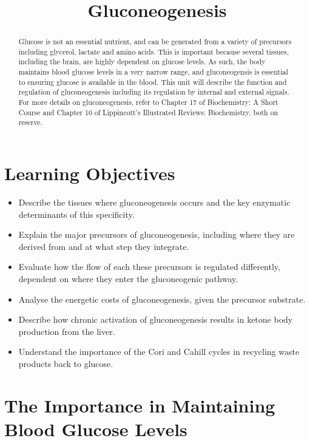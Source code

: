 \documentclass{tufte-handout}
\title{Gluconeogenesis}
\author{}
\date{}  %
\begin{document}
\maketitle%

\begin{abstract}
\noindent Glucose is not an essential nutrient, and can be generated from a variety of precursors including glycerol, lactate and amino acids.  This is important because several tissues, including the brain, are highly dependent on glucose levels.  As such, the body maintains blood glucose levels in a very narrow range, and gluconeogensis is essential to ensuring glucose is available in the blood.  This unit will describe the function and regulation of gluconeogenesis including its regulation by internal and external signals.  For more details on gluconeogenesis, refer to Chapter 17 of Biochemistry: A Short Course\cite{Berg2015} and Chapter 10 of Lippincott's Illustrated Reviews: Biochemistry\cite{Ferrier2017}, both on reserve.
\end{abstract}

\tableofcontents
\pagebreak
\section{Learning Objectives}

\begin{itemize}
\item Describe the tissues where gluconeogenesis occurs and the key enzymatic determinants of this specificity.
\item Explain the major precursors of gluconeogenesis, including where they are derived from and at what step they integrate.
\item Evaluate how the flow of each these precursors is regulated differently, dependent on where they enter the gluconeogenic pathway.
\item Analyse the energetic costs of gluconeogenesis, given the precursor substrate.
\item Describe how chronic activation of gluconeogenesis results in ketone body production from the liver.
\item Understand the importance of the Cori and Cahill cycles in recycling waste products back to glucose.
\end{itemize}

\section{The Importance in Maintaining Blood Glucose Levels}
\end{document}
